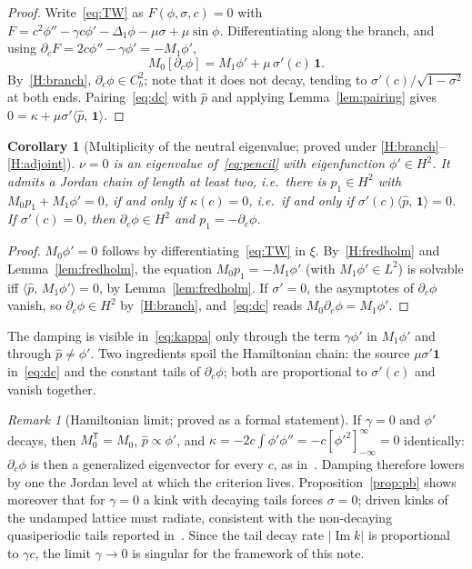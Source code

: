 \documentclass[11pt]{article}
\theoremstyle{plain}
\newtheorem{corollary}[theorem]{Corollary}
\theoremstyle{definition}
\theoremstyle{remark}
\newtheorem{remark}[theorem]{Remark}
\newcommand{\ip}[2]{\langle #1,\,#2\rangle}
\newcommand{\ph}{\hat p}
\newcommand{\one}{\mathbf 1}
\newcommand{\T}{\mathsf T}
\newcommand{\tagP}{\textsf{proved}}
\newcommand{\tagC}[1]{\textsf{proved under #1}}
\begin{document}
\begin{proof}
Write~\eqref{eq:TW} as $F(\phi,\sigma,c)=0$ with
$F=c^2\phi''-\gamma c\phi'-\Delta_1\phi-\mu\sigma+\mu\sin\phi$. Differentiating along the
branch, and using $\partial_cF=2c\phi''-\gamma\phi'=-M_1\phi'$,
\begin{equation}\label{eq:dc}
  M_0[\partial_c\phi]=M_1\phi'+\mu\,\sigma'(c)\,\one .
\end{equation}
By~\ref{H:branch}, $\partial_c\phi\in C^2_b$; note that it does not decay, tending to
$\sigma'(c)/\sqrt{1-\sigma^2}$ at both ends. Pairing~\eqref{eq:dc} with $\ph$ and applying
Lemma~\ref{lem:pairing} gives $0=\kappa+\mu\sigma'\ip{\ph}{\one}$.
\end{proof}

\begin{corollary}[Multiplicity of the neutral eigenvalue; \tagC{\ref{H:branch}--\ref{H:adjoint}}]\label{cor:mult}
$\nu=0$ is an eigenvalue of~\eqref{eq:pencil} with eigenfunction $\phi'\in H^2$. It admits a
Jordan chain of length at least two, i.e.\ there is $p_1\in H^2$ with $M_0p_1+M_1\phi'=0$,
if and only if $\kappa(c)=0$, i.e.\ if and only if $\sigma'(c)\ip{\ph}{\one}=0$. If
$\sigma'(c)=0$, then $\partial_c\phi\in H^2$ and $p_1=-\partial_c\phi$.
\end{corollary}

\begin{proof}
$M_0\phi'=0$ follows by differentiating~\eqref{eq:TW} in $\xi$. By~\ref{H:fredholm} and Lemma~\ref{lem:fredholm}, the
equation $M_0p_1=-M_1\phi'$ (with $M_1\phi'\in L^2$) is solvable iff
$\ip{\ph}{M_1\phi'}=0$, by Lemma~\ref{lem:fredholm}. If $\sigma'=0$, the asymptotes of $\partial_c\phi$ vanish, so
$\partial_c\phi\in H^2$ by~\ref{H:branch}, and~\eqref{eq:dc} reads $M_0\partial_c\phi=M_1\phi'$.
\end{proof}

The damping is visible in~\eqref{eq:kappa} only through the term $\gamma\phi'$ in
$M_1\phi'$ and through $\ph\neq\phi'$. Two ingredients spoil the Hamiltonian chain: the
source $\mu\sigma'\one$ in~\eqref{eq:dc} and the constant tails of $\partial_c\phi$; both are
proportional to $\sigma'(c)$ and vanish together.

\begin{remark}[Hamiltonian limit; \tagP{} as a formal statement]\label{rem:ham}
If $\gamma=0$ and $\phi'$ decays, then $M_0^{\T}=M_0$, $\ph\propto\phi'$, and
$\kappa=-2c\int\phi'\phi''=-c[\phi'^2]_{-\infty}^{\infty}=0$ identically: $\partial_c\phi$ is
then a generalized eigenvector for every $c$, as in~\cite{FP04,XCKV18}. Damping therefore
lowers by one the Jordan level at which the criterion lives. Proposition~\ref{prop:pb}
shows moreover that for $\gamma=0$ a kink with decaying tails forces $\sigma=0$; driven
kinks of the undamped lattice must radiate, consistent with the non-decaying quasiperiodic
tails reported in~\cite{VCKX20}. Since the tail decay rate $|\operatorname{Im}k|$ is
proportional to $\gamma c$, the limit $\gamma\to0$ is singular for the framework of this note.
\end{remark}
\end{document}
